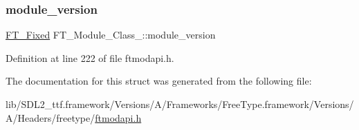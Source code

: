 \subsubsection{\texorpdfstring{module\_version}{module\_version}}
{\footnotesize\ttfamily \mbox{\hyperlink{fttypes_8h_a5f5a679cc09f758efdd0d1c5feed3c3d}{F\+T\+\_\+\+Fixed}} F\+T\+\_\+\+Module\+\_\+\+Class\+\_\+\+::module\+\_\+version}



Definition at line 222 of file ftmodapi.\+h.



The documentation for this struct was generated from the following file\+:\begin{DoxyCompactItemize}
\item 
lib/\+S\+D\+L2\+\_\+ttf.\+framework/\+Versions/\+A/\+Frameworks/\+Free\+Type.\+framework/\+Versions/\+A/\+Headers/freetype/\mbox{\hyperlink{ftmodapi_8h}{ftmodapi.\+h}}\end{DoxyCompactItemize}
